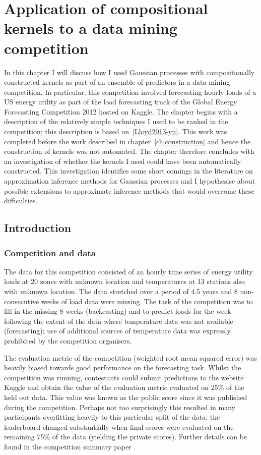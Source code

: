 
\inbpdocument

\chapter{Application of compositional kernels to a data mining competition}
\label{ch:gefcom}

In this chapter I will discuss how I used Gaussian processes with compositionally constructed kernels as part of an ensemble of predictors in a data mining competition.
In particular, this competition involved forecasting hourly loads of a US energy utility as part of the load forecasting track of the Global Energy Forecasting Competition 2012 hosted on Kaggle.
The chapter begins with a description of the relatively simple techniques I used to be ranked  in the competition; this description is based on~\ref{Lloyd2013-yn}.
This work was completed before the work described in chapter~\ref{ch:construction} and hence the construction of kernels was not automated.
The chapter therefore concludes with an investigation of whether the kernels I used could have been automatically constructed.
This investigation identifies some short comings in the literature on approximation inference methods for Gaussian processes and I hypothesise about possible extensions to approximate inference methods that would overcome these difficulties.

\section{Introduction}

\subsection{Competition and data}

The data for this competition consisted of an hourly time series of energy utility loads at 20 zones with unknown location and temperatures at 13 stations also with unknown location.
The data stretched over a period of 4.5 years and 8 non-consecutive weeks of load data were missing.
The task of the competition was to fill in the missing 8 weeks (backcasting) and to predict loads for the week following the extent of the data where temperature data was not available (forecasting); use of additional sources of temperature data was expressly prohibited by the competition organisers.

The evaluation metric of the competition (weighted root mean squared error) was heavily biased towards good performance on the forecasting task.
Whilst the competition was running, contestants could submit predictions to the website Kaggle and obtain the value of the evaluation metric evaluated on 25\% of the held out data.
This value was known as the public score since it was published during the competition.
Perhaps not too surprisingly this resulted in many participants overfitting heavily to this particular split of the data; the leaderboard changed substantially when final scores were evaluated on the remaining 75\% of the data (yielding the private scores).
Further details can be found in the competition summary paper \citep{Hong2014-yf}.

